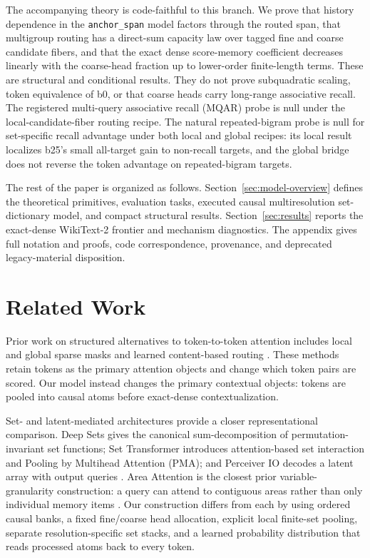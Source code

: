 \documentclass{article}
\theoremstyle{plain}
\theoremstyle{definition}
\theoremstyle{remark}
\begin{document}
The accompanying theory is code-faithful to this branch.  We prove that
history dependence in the \texttt{anchor\_span} model factors through the
routed span, that multigroup routing has a direct-sum capacity law over tagged
fine and coarse candidate fibers, and that the exact dense score-memory
coefficient decreases linearly with the coarse-head fraction up to lower-order
finite-length terms.  These are structural and conditional results.  They do
not prove subquadratic scaling, token equivalence of b0, or that coarse heads
carry long-range associative recall.  The registered multi-query associative
recall (MQAR) probe is null under the local-candidate-fiber routing recipe.  The
natural repeated-bigram probe is null for set-specific recall advantage under
both local and global recipes: its local result localizes b25's small all-target
gain to non-recall targets, and the global bridge does not reverse the token
advantage on repeated-bigram targets.

The rest of the paper is organized as follows. Section~\ref{sec:model-overview}
defines the theoretical primitives, evaluation tasks, executed causal
multiresolution set-dictionary model, and compact structural results.
Section~\ref{sec:results} reports the exact-dense WikiText-2 frontier and
mechanism diagnostics.  The appendix gives full notation and proofs, code
correspondence, provenance, and deprecated legacy-material disposition.

\section{Related Work}
Prior work on structured alternatives to token-to-token attention includes
local and global sparse masks and learned content-based routing
\citep{beltagy2020longformer,zaheer2020bigbird,roy2020routing}.  These methods
retain tokens as the primary attention objects and change which token pairs are
scored.  Our model instead changes the primary contextual objects: tokens are
pooled into causal atoms before exact-dense contextualization.

Set- and latent-mediated architectures provide a closer representational
comparison.  Deep Sets gives the canonical sum-decomposition of
permutation-invariant set functions; Set Transformer introduces
attention-based set interaction and Pooling by Multihead Attention (PMA); and
Perceiver IO decodes a latent array with output queries
\citep{zaheer2017deepsets,lee2019settransformer,jaegle2021perceiverio}.  Area
Attention is the closest prior variable-granularity construction: a query can
attend to contiguous areas rather than only individual memory items
\citep{li2019areaattention}.  Our construction differs from each by using
ordered causal banks, a fixed fine/coarse head allocation, explicit local
finite-set pooling, separate resolution-specific set stacks, and a learned
probability distribution that reads processed atoms back to every token.
\end{document}
